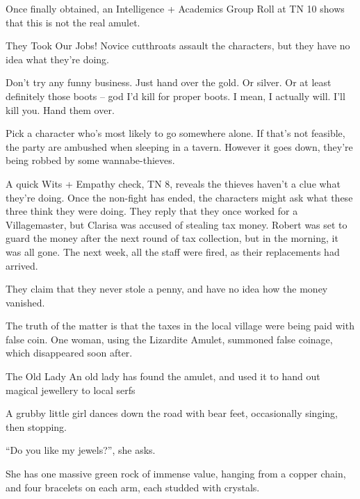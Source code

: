 \begin{multicols}{2}
Once finally obtained, an Intelligence + Academics Group Roll at TN 10 shows that this is not the real amulet.

{They Took Our Jobs!}%
{Novice cutthroats assault the characters, but they have no idea what they're doing.}%

\begin{speechtext}

  Don't try any funny business.  Just hand over the gold. Or silver.  Or at least definitely those boots -- god I'd kill for proper boots.  I mean, I actually will.  I'll kill you.  Hand them over.

\end{speechtext}

Pick a character who's most likely to go somewhere alone.  If that's not feasible, the party are ambushed when sleeping in a tavern.
However it goes down, they're being robbed by some wannabe-thieves.

A quick Wits + Empathy check, TN 8, reveals the thieves haven't a clue what they're doing.
Once the non-fight has ended, the characters might ask what these three think they were doing.
They reply that they once worked for a Villagemaster, but Clarisa was accused of stealing tax money.
Robert was set to guard the money after the next round of tax collection, but in the morning, it was all gone.
The next week, all the staff were fired, as their replacements had arrived.

They claim that they never stole a penny, and have no idea how the money vanished.

The truth of the matter is that the taxes in the local village were being paid with false coin.
One woman, using the Lizardite Amulet, summoned false coinage, which disappeared soon after.



{The Old Lady}%
{An old lady has found the amulet, and used it to hand out magical jewellery to local serfs}%

\begin{boxtext}
  A grubby little girl dances down the road with bear feet, occasionally singing, then stopping.

    ``Do you like my jewels?'', she asks.

  She has one massive green rock of immense value, hanging from a copper chain, and four bracelets on each arm, each studded with crystals.
\end{boxtext}


\end{multicols}
